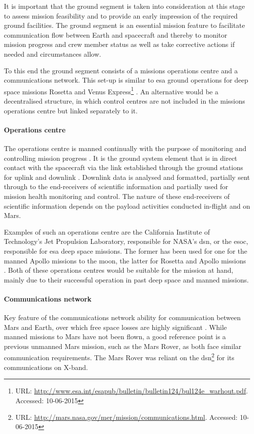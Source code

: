 It is important that the ground segment is taken into consideration at this stage to assess mission feasibility and to provide an early impression of the required ground facilities. The ground segment is an essential mission feature to facilitate communication flow between Earth and spacecraft and thereby to monitor mission progress and crew member status as well as take corrective actions if needed and circumstances allow.

To this end the ground segment consists of a missions operations centre and a communications network. This set-up is similar to \gls{esa} ground operations for deep space missions Rosetta and Venus Express\footnote{URL: \url{http://www.esa.int/esapub/bulletin/bulletin124/bul124e_warhout.pdf}. Accessed: 10-06-2015}  \cite{Warhaut2007}. An alternative would be a decentralised structure, in which control centres are not included in the missions operations centre but linked separately to it. 

\paragraph{Operations centre}
The operations centre is manned continually with the purpose of monitoring and controlling mission progress \cite{Warhaut2007}. It is the ground system element that is in direct contact with the spacecraft via the link established through the ground stations for uplink and downlink \cite[p.879]{Wertz2011}. Downlink data is analysed and formatted, partially sent through to the end-receivers of scientific information and partially used for mission health monitoring and control. The nature of these end-receivers of scientific information depends on the payload activities conducted in-flight and on Mars. 

Examples of such an operations centre are the California Institute of Technology's Jet Propulsion Laboratory, responsible for NASA's \gls{dsn}, or the \gls{esoc}, responsible for \gls{esa} deep space missions. The former has been used for one for the manned Apollo missions to the moon, the latter for Rosetta and Apollo missions \cite[p.883]{Wertz2011}\cite{Warhaut2007}. Both of these operations centres would be suitable for the mission at hand, mainly due to their successful operation in past deep space and manned missions. 

\paragraph{Communications network}
Key feature of the communications network ability for communication between Mars and Earth, over which free space losses are highly significant \cite{Wertz2011}. While manned missions to Mars have not been flown, a good reference point is a previous unmanned Mars mission, such as the Mars Rover, as both face similar communication requirements. The Mars Rover was reliant on the \gls{dsn}\footnote{URL: \url{http://mars.nasa.gov/mer/mission/communications.html}. Accessed: 10-06-2015} for its communications on X-band. 


